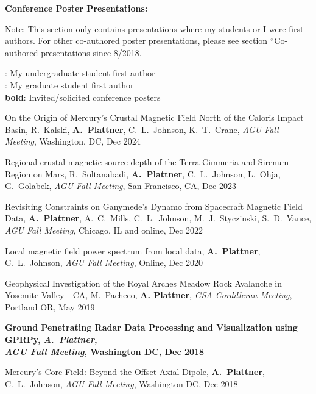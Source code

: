 \documentclass[10pt]{article}
\begin{document}
\spc
\textbf{\tsize Conference Poster Presentations:}

\vspace{0.2cm}
Note: This section only contains presentations where my students or I were first authors. For other co-authored poster presentations, please see section ``Co-authored presentations since 8/2018.


\spcp
\ug: My undergraduate student first author\\
\gr: My graduate student first author\\
\textbf{bold}: Invited/solicited conference posters

\spcp
\hspace*{-0.4cm} \gr \hspace*{-0.05cm} On the Origin of Mercury's Crustal
Magnetic Field North of the Caloris Impact Basin, R.\ Kalski,
\textbf{A.\ Plattner}, C.~L.~Johnson, K.\ T.\ Crane, \emph{AGU Fall
Meeting}, Washington, DC, Dec 2024

\spcp
\hspace*{-0.35cm} \gr \hspace*{0.02cm} Regional crustal magnetic source depth of the Terra Cimmeria and Sirenum Region on Mars, R.~Soltanabadi, \textbf{A.~Plattner}, C.~L.~Johnson, L.~Ohja, G.~Golabek, \emph{AGU Fall Meeting}, San Francisco, CA, Dec 2023 

\spcp
Revisiting Constraints on Ganymede's Dynamo from Spacecraft Magnetic Field Data,
\textbf{A.~Plattner}, A.~C.~Mills, C.~L.~Johnson, M.~J.~Styczinski, S.~D.~Vance,  \emph{AGU Fall Meeting}, Chicago, IL and online, Dec 2022 

\spcp
Local magnetic field power spectrum from local data,
\textbf{A.~Plattner}, C.~L.~Johnson, 
\emph{AGU Fall Meeting}, Online, Dec 2020 

\spcp
\hspace*{-0.35cm} \gr \hspace*{0.05cm} Geophysical Investigation of the Royal Arches Meadow Rock
Avalanche in Yosemite Valley - CA,
M.~Pacheco, \textbf{A. Plattner},
\emph{GSA Cordilleran Meeting}, Portland OR, May 2019

\spcp
\textbf{Ground Penetrating Radar Data Processing and Visualization using
GPRPy,
\emph{A.~Plattner},\\
\emph{AGU Fall Meeting}, Washington DC, Dec 2018}

\spcp
Mercury's Core Field: Beyond the Offset Axial Dipole,
\textbf{A.~Plattner}, C.~L.~Johnson, 
\emph{AGU Fall Meeting}, Washington DC, Dec 2018 
\end{document}
